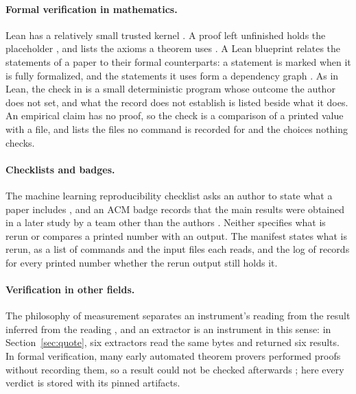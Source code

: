 \paragraph{Formal verification in mathematics.} Lean has a relatively small trusted kernel
\citep{demoura2021lean4}. A proof left unfinished holds the placeholder , and
 lists the axioms a theorem uses \citep{avigad2026tpil}. A Lean blueprint
relates the statements of a paper to their formal counterparts: a statement is marked when it is
fully formalized, and the statements it uses form a dependency graph
\citep{massot2020leanblueprint}. As in Lean, the check in  is a small deterministic
program whose outcome the author does not set, and what the record does not establish is listed
beside what it does. An empirical claim has no proof, so the check is a
comparison of a printed value with a file, and  lists the files no command is
recorded for and the choices nothing checks.

\paragraph{Checklists and badges.} The machine learning reproducibility checklist asks an author
to state what a paper includes \citep{pineau2020improving}, and an ACM badge records that
the main results were obtained in a later study by a team other than the authors
\citep{acm2020badging}. Neither specifies what is rerun or
compares a printed number with an output. The  manifest states what is rerun, as a
list of commands and the input files each reads, and the log of  records
for every printed number whether the rerun output still holds it.

\paragraph{Verification in other fields.} The philosophy of measurement separates an instrument's reading from the result inferred from the
reading \citep{tal2017calibration}, and an extractor is an instrument in this sense: in
Section~\ref{sec:quote}, six extractors read the same bytes and returned six results. In formal
verification, many early automated theorem provers performed proofs without recording them, so a
result could not be checked afterwards \citep{mackenzie2001mechanizing}; here every verdict is
stored with its pinned artifacts.
